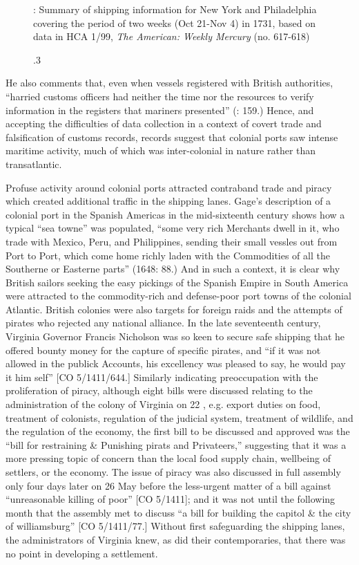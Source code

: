 \begin{figure}
\caption{\label{tab:key:4}.3}: Summary of shipping information for New York and Philadelphia covering the period of two weeks (Oct 21-Nov 4) in 1731, based on data in HCA 1/99, \textit{The American: Weekly Mercury} (no. 617-618) 

  
\end{figure}
 

He also comments that, even when vessels registered with British authorities, “harried customs officers had neither the time nor the resources to verify information in the registers that mariners presented” (\citealt{Jarvis2010}: 159.) Hence, and accepting the difficulties of data collection in a context of covert trade and falsification of customs records, records suggest that colonial ports saw intense maritime activity, much of which was inter-colonial in nature rather than transatlantic. 

Profuse activity around colonial ports attracted contraband trade and piracy which created additional traffic in the shipping lanes. Gage’s description of a colonial port in the Spanish Americas in the mid-sixteenth century shows how a typical “sea towne” was populated, “some very rich Merchants dwell in it, who trade with Mexico, Peru, and Philippines, sending their small vessles out from Port to Port, which come home richly laden with the Commodities of all the Southerne or Easterne parts” (1648: 88.) And in such a context, it is clear why British sailors seeking the easy pickings of the Spanish Empire in South America were attracted to the commodity-rich and defense-poor port towns of the colonial Atlantic. British colonies were also targets for foreign raids and the attempts of pirates who rejected any national alliance. In the late seventeenth century, Virginia Governor Francis Nicholson was so keen to secure safe shipping that he offered bounty money for the capture of specific pirates, and “if it was not allowed in the publick Accounts, his excellency was pleased to say, he would pay it him self” [CO 5/1411/644.] Similarly indicating preoccupation with the proliferation of piracy, although eight bills were discussed relating to the administration of the colony of Virginia on 22 \citealt{May1699}, e.g. export duties on food, treatment of colonists, regulation of the judicial system, treatment of wildlife, and the regulation of the economy, the first bill to be discussed and approved was the “bill for restraining \& Punishing pirats and Privateers,” suggesting that it was a more pressing topic of concern than the local food supply chain, wellbeing of settlers, or the economy. The issue of piracy was also discussed in full assembly only four days later on 26 May before the less-urgent matter of a bill against “unreasonable killing of poor” [CO 5/1411]; and it was not until the following month that the assembly met to discuss “a bill for building the capitol \& the city of williamsburg” [CO 5/1411/77.] Without first safeguarding the shipping lanes, the administrators of Virginia knew, as did their contemporaries, that there was no point in developing a settlement. 

